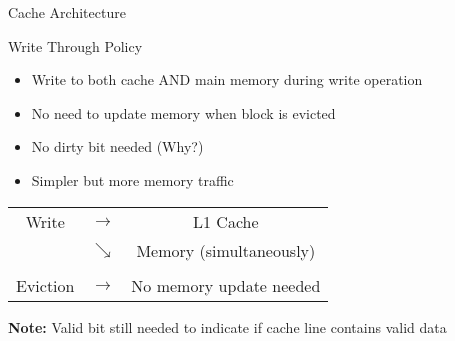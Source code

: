 \documentclass[aspectratio=169,12pt]{beamer}
\begin{document}
\begin{frame}[fragile]{Cache Architecture}
\begin{center}
\end{center}
\end{frame}



\begin{frame}{Write Through Policy}
\begin{itemize}
    \item Write to both cache AND main memory during write operation
    \item No need to update memory when block is evicted
    \item \alert{No dirty bit needed} (Why?)
    \item Simpler but more memory traffic
\end{itemize}

\begin{center}
\begin{tcolorbox}[colback=green!10, width=0.8\textwidth]
\begin{tabular}{c c c}
Write & $\rightarrow$ & L1 Cache \\
      & $\searrow$ & Memory (simultaneously)\\
& & \\
Eviction & $\rightarrow$ & No memory update needed
\end{tabular}
\end{tcolorbox}
\end{center}

\textbf{Note:} Valid bit still needed to indicate if cache line contains valid data
\end{frame}
\end{document}
